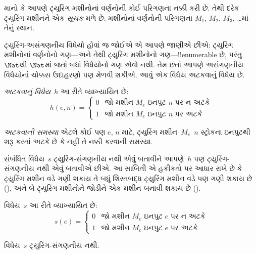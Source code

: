 \documentclass[../../../include/open-logic-section]{subfiles}
\begin{document}

\begin{explain}
માનો કે આપણે ટ્યુરિંગ મશીનોનાં વર્ણનોની કોઈ પરિગણના
નક્કી કરી છે. તેથી દરેક ટ્યુરિંગ મશીનને એક
\emph{સૂચક} મળે છે: મશીનોનાં વર્ણનોની પરિગણના
$M_1$, $M_2$, $M_3$, \dots{}માં તેનું સ્થાન.

ટ્યુરિંગ-અસંગણનીય વિધેયો હોવાં જ જોઈએ એ આપણે
જાણીએ છીએ: ટ્યુરિંગ મશીનોનાં વર્ણનોનો ગણ---અને તેથી
ટ્યુરિંગ મશીનોનો ગણ---!!{enumerable} છે, પરંતુ
$\Nat$થી $\Nat$માં જતાં બધાં વિધેયોનો ગણ એવો નથી.
તેમ છતાં આપણે અસંગણનીય વિધેયોનાં ચોક્કસ ઉદાહરણો પણ
મેળવી શકીએ. આવું એક વિધેય અટકવાનું વિધેય છે.
\end{explain}

\begin{defn}[અટકવાનું વિધેય]
 \emph{અટકવાનું વિધેય}~$h$ આ રીતે વ્યાખ્યાયિત છે:
\[
h(e,n) =
\begin{cases}
  \text{0} & \text{જો મશીન~$M_e$ ઇનપુટ $n$ પર ન અટકે} \\
  \text{1} & \text{જો મશીન~$M_e$ ઇનપુટ $n$ પર અટકે}
\end{cases}
\]
\end{defn}

\begin{defn}
\emph{અટકવાની સમસ્યા} એટલે કોઈ પણ $e$, $n$ માટે,
ટ્યુરિંગ મશીન~$M_e$~$n$ સ્ટ્રોકના
ઇનપુટથી શરૂ કરતાં અટકે છે કે નહીં તે નક્કી કરવાની
સમસ્યા.
\end{defn}

\begin{explain}
સંબંધિત વિધેય~$s$ ટ્યુરિંગ-સંગણનીય નથી એવું બતાવીને
આપણે~$h$ પણ ટ્યુરિંગ-સંગણનીય નથી એવું બતાવીએ છીએ.
આ સાબિતી એ હકીકતો પર આધાર રાખે છે કે ટ્યુરિંગ મશીન
વડે ગણી શકાય તે બધું શિસ્તબદ્ધ ટ્યુરિંગ મશીન વડે પણ
ગણી શકાય છે (), અને બે ટ્યુરિંગ
મશીનોને જોડીને એક મશીન બનાવી શકાય છે
().
\end{explain}

\begin{defn} વિધેય~$s$ આ રીતે વ્યાખ્યાયિત છે:
\[
s(e) =
\begin{cases}
  \text{0} & \text{જો મશીન~$M_e$ ઇનપુટ $e$ પર ન અટકે} \\
  \text{1} & \text{જો મશીન~$M_e$ ઇનપુટ $e$ પર અટકે}
\end{cases}
\]
\end{defn}

\begin{lem}
વિધેય~$s$ ટ્યુરિંગ-સંગણનીય નથી.
\end{lem}
\end{document}

